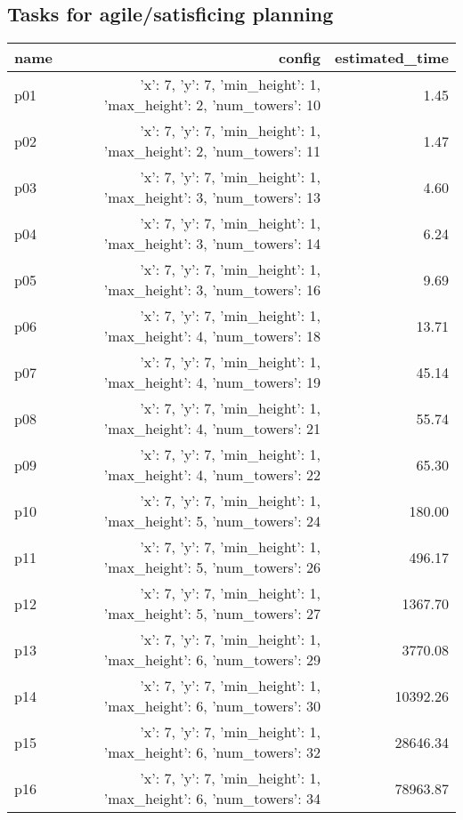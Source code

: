 \documentclass{article}
\begin{document}
                                \subsection*{Tasks for agile/satisficing planning}
                                
                            \begin{center}
                            \scriptsize
                            \begin{tabular}{@{}l|r|r@{}}
                            name & config & estimated\_time\\\midrule
                              p01&{'x': 7, 'y': 7, 'min\_height': 1, 'max\_height': 2, 'num\_towers': 10}&1.45\\
  p02&{'x': 7, 'y': 7, 'min\_height': 1, 'max\_height': 2, 'num\_towers': 11}&1.47\\
  p03&{'x': 7, 'y': 7, 'min\_height': 1, 'max\_height': 3, 'num\_towers': 13}&4.60\\
  p04&{'x': 7, 'y': 7, 'min\_height': 1, 'max\_height': 3, 'num\_towers': 14}&6.24\\
  p05&{'x': 7, 'y': 7, 'min\_height': 1, 'max\_height': 3, 'num\_towers': 16}&9.69\\
  p06&{'x': 7, 'y': 7, 'min\_height': 1, 'max\_height': 4, 'num\_towers': 18}&13.71\\
  p07&{'x': 7, 'y': 7, 'min\_height': 1, 'max\_height': 4, 'num\_towers': 19}&45.14\\
  p08&{'x': 7, 'y': 7, 'min\_height': 1, 'max\_height': 4, 'num\_towers': 21}&55.74\\
  p09&{'x': 7, 'y': 7, 'min\_height': 1, 'max\_height': 4, 'num\_towers': 22}&65.30\\
  p10&{'x': 7, 'y': 7, 'min\_height': 1, 'max\_height': 5, 'num\_towers': 24}&180.00\\
  p11&{'x': 7, 'y': 7, 'min\_height': 1, 'max\_height': 5, 'num\_towers': 26}&496.17\\
  p12&{'x': 7, 'y': 7, 'min\_height': 1, 'max\_height': 5, 'num\_towers': 27}&1367.70\\
  p13&{'x': 7, 'y': 7, 'min\_height': 1, 'max\_height': 6, 'num\_towers': 29}&3770.08\\
  p14&{'x': 7, 'y': 7, 'min\_height': 1, 'max\_height': 6, 'num\_towers': 30}&10392.26\\
  p15&{'x': 7, 'y': 7, 'min\_height': 1, 'max\_height': 6, 'num\_towers': 32}&28646.34\\
  p16&{'x': 7, 'y': 7, 'min\_height': 1, 'max\_height': 6, 'num\_towers': 34}&78963.87\\

\end{tabular}
\end{center}
\end{document}
